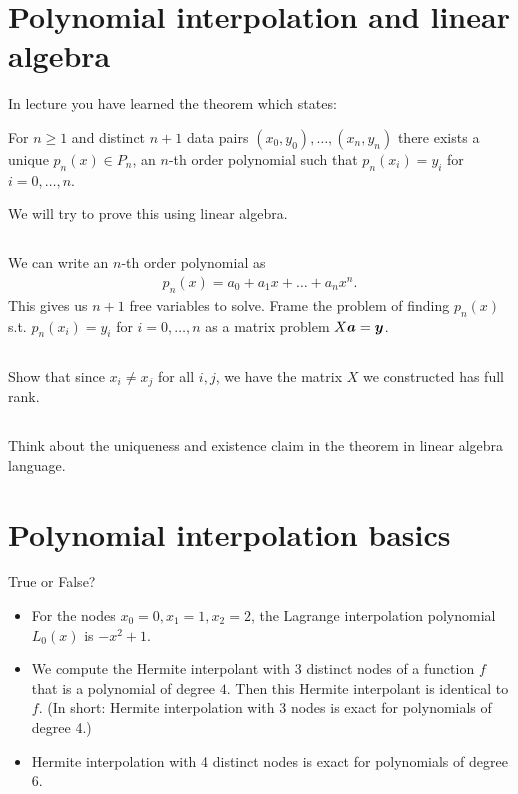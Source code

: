 \documentclass[11pt,letterpaper]{report}
\begin{document}
\section{Polynomial interpolation and linear algebra}
In lecture you have learned the theorem which states:

For $n\geq 1$ and distinct $n+1$ data pairs $(x_0,y_0),\dots,(x_n,y_n)$ there exists a unique $p_n(x)\in P_n$, an $n$-th order polynomial such that $p_n(x_i) = y_i$ for $i = 0,\dots,n$. 

We will try to prove this using linear algebra.

\subsection{}
We can write an $n$-th order polynomial as
\begin{align*}
    p_n(x) = a_0 + a_1x + \dots + a_nx^n.
\end{align*}
This gives us $n+1$ free variables to solve. Frame the problem of finding $p_n(x)$ s.t. $p_n(x_i) = y_i$ for $i = 0,\dots,n$ as a matrix problem $X\boldsymbol{a} = \boldsymbol{y}$.

\subsection{}
Show that since $x_i\neq x_j$ for all $i,j$, we have the matrix $X$ we constructed has full rank. 

\subsection{}
Think about the uniqueness and existence claim in the theorem in linear algebra language. 

\section{Polynomial interpolation basics}
True or False?
\begin{itemize}
\item For the nodes $x_0=0, x_1=1, x_2= 2$, the
  Lagrange interpolation polynomial $L_0(x)$ is $-x^2 + 1$.
\item We compute the Hermite interpolant with 3 distinct nodes of
  a function $f$ that is a polynomial of degree $4$. Then this
  Hermite interpolant is identical to $f$. (In short: Hermite
  interpolation with 3 nodes is exact for polynomials of degree 4.)
\item Hermite interpolation with 4 distinct nodes is exact for
  polynomials of degree 6.
\end{itemize}
\end{document}
